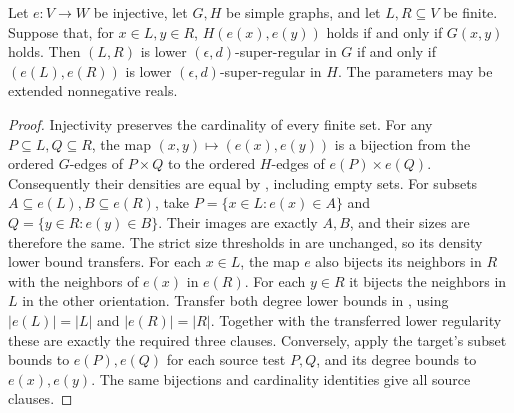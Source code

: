 \begin{lemma}
Let $e:V\to W$ be injective, let $G,H$ be simple graphs, and let
$L,R\subseteq V$ be finite. Suppose that, for $x\in L,y\in R$,
$H(e(x),e(y))$ holds if and only if $G(x,y)$ holds.
Then $(L,R)$ is lower $(\epsilon,d)$-super-regular in $G$ if and only if
$(e(L),e(R))$ is lower $(\epsilon,d)$-super-regular in $H$.
The parameters may be extended nonnegative reals.
\end{lemma}
\begin{proof}
Injectivity preserves the cardinality of every finite set. For any
$P\subseteq L,Q\subseteq R$, the map $(x,y)\mapsto(e(x),e(y))$
is a bijection from the ordered $G$-edges of $P\times Q$ to the
ordered $H$-edges of $e(P)\times e(Q)$. Consequently their densities
are equal by , including empty sets.
For subsets $A\subseteq e(L),B\subseteq e(R)$, take
$P=\{x\in L:e(x)\in A\}$ and $Q=\{y\in R:e(y)\in B\}$.
Their images are exactly $A,B$, and their sizes are therefore the
same. The strict size thresholds in 
are unchanged, so its density lower bound transfers.
For each $x\in L$, the map $e$ also bijects its neighbors in $R$
with the neighbors of $e(x)$ in $e(R)$. For each $y\in R$ it
bijects the neighbors in $L$ in the other orientation. Transfer both
degree lower bounds in , using
$|e(L)|=|L|$ and $|e(R)|=|R|$. Together with the transferred
lower regularity these are exactly the required three clauses.
Conversely, apply the target's subset bounds to $e(P),e(Q)$ for
each source test $P,Q$, and its degree bounds to $e(x),e(y)$.
The same bijections and cardinality identities give all source clauses.
\end{proof}
